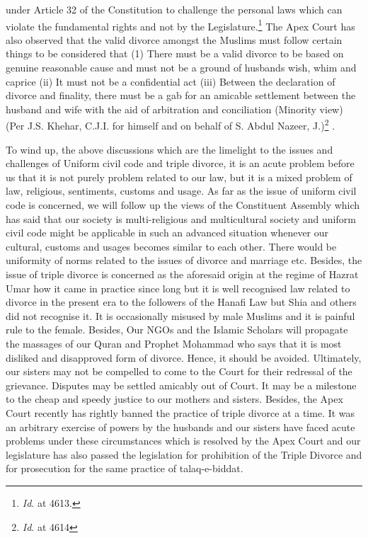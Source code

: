 \begin{multicols}{2}
under Article 32 of the Constitution to challenge the personal laws which can violate the
fundamental rights and not by the Legislature.\footnote{{\it Id}. at 4613.} The Apex Court has also observed that the
valid divorce amongst the Muslims must follow certain things to be considered that (1) There
must be a valid divorce to be based on genuine reasonable cause and must not be a ground of
husbands wish, whim and caprice (ii) It must not be a confidential act (iii) Between the
declaration of divorce and finality, there must be a gab for an amicable settlement between
the husband and wife with the aid of arbitration and conciliation (Minority view) (Per J.S.
Khehar, C.J.I. for himself and on behalf of S. Abdul Nazeer, J.)\footnote{{\it Id}. at 4614}
.


\noi
To wind up, the above discussions which are the limelight to the issues and challenges of
Uniform civil code and triple divorce, it is an acute problem before us that it is not purely problem related to our law, but it is a mixed problem of law, religious, sentiments, customs
and usage. As far as the issue of uniform civil code is concerned, we will follow up the views
of the Constituent Assembly which has said that our society is multi-religious and multicultural society and uniform civil code might be applicable in such an advanced situation
whenever our cultural, customs and usages becomes similar to each other. There would be
uniformity of norms related to the issues of divorce and marriage etc. Besides, the issue of
triple divorce is concerned as the aforesaid origin at the regime of Hazrat Umar how it came
in practice since long but it is well recognised law related to divorce in the present era to the
followers of the Hanafi Law but Shia and others did not recognise it. It is occasionally
misused by male Muslims and it is painful rule to the female. Besides, Our NGOs and the
Islamic Scholars will propagate the massages of our Quran and Prophet Mohammad who
says that it is most disliked and disapproved form of divorce. Hence, it should be avoided.
Ultimately, our sisters may not be compelled to come to the Court for their redressal of the
grievance. Disputes may be settled amicably out of Court. It may be a milestone to the cheap
and speedy justice to our mothers and sisters. Besides, the Apex Court recently has rightly
banned the practice of triple divorce at a time. It was an arbitrary exercise of powers by the
husbands and our sisters have faced acute problems under these circumstances which is
resolved by the Apex Court and our legislature has also passed the legislation for prohibition
of the Triple Divorce and for prosecution for the same practice of talaq-e-biddat.


\end{multicols}
